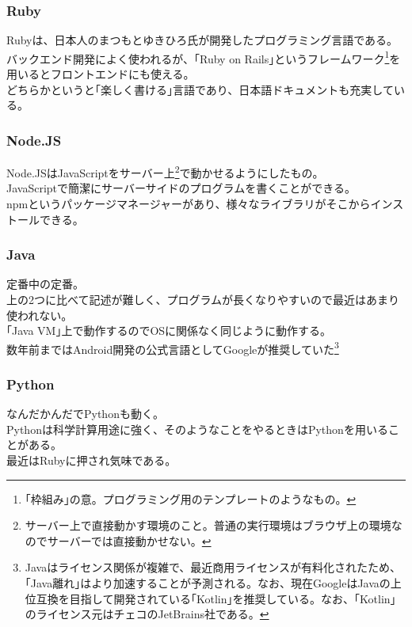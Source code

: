 \documentclass{ltjsarticle}
\begin{document}
\subsubsection{Ruby}
Rubyは、日本人のまつもとゆきひろ氏が開発したプログラミング言語である。\\
バックエンド開発によく使われるが、｢Ruby on Rails｣というフレームワーク\footnote[8]{｢枠組み｣の意。プログラミング用のテンプレートのようなもの。}を用いるとフロントエンドにも使える。\\
どちらかというと｢楽しく書ける｣言語であり、日本語ドキュメントも充実している。

\subsubsection{Node.JS}
Node.JSはJavaScriptをサーバー上\footnote[9]{サーバー上で直接動かす環境のこと。普通の実行環境はブラウザ上の環境なのでサーバーでは直接動かせない。}で動かせるようにしたもの。\\
JavaScriptで簡潔にサーバーサイドのプログラムを書くことができる。\\
npmというパッケージマネージャーがあり、様々なライブラリがそこからインストールできる。

\subsubsection{Java}
定番中の定番。\\
上の2つに比べて記述が難しく、プログラムが長くなりやすいので最近はあまり使われない。\\
｢Java VM｣上で動作するのでOSに関係なく同じように動作する。\\
数年前まではAndroid開発の公式言語としてGoogleが推奨していた\footnote[10]{Javaはライセンス関係が複雑で、最近商用ライセンスが有料化されたため、｢Java離れ｣はより加速することが予測される。なお、現在GoogleはJavaの上位互換を目指して開発されている｢Kotlin｣を推奨している。なお、｢Kotlin｣のライセンス元はチェコのJetBrains社である。}

\subsubsection{Python}
なんだかんだでPythonも動く。\\
Pythonは科学計算用途に強く、そのようなことをやるときはPythonを用いることがある。\\
最近はRubyに押され気味である。
\end{document}
